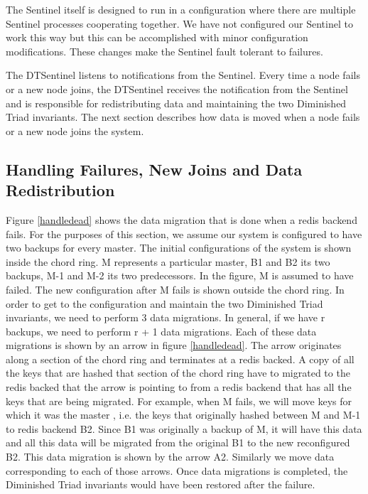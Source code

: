 \documentclass[10pt,twocolumn,letterpaper]{article}
\begin{document}
The Sentinel itself is designed to run in a configuration where there are multiple Sentinel processes cooperating together. We have not configured our Sentinel to work this way but this can be accomplished with minor configuration modifications. These changes make the Sentinel fault tolerant to failures. 

The DTSentinel listens to notifications from the Sentinel. Every time a node fails or a new node joins, the DTSentinel receives the notification from the Sentinel and is responsible for redistributing data and maintaining the two Diminished Triad invariants. The next section describes how data is moved when a node fails or a new node joins the system.

\subsection{Handling Failures, New Joins and Data Redistribution}

Figure \ref{handledead} shows the data migration that is done when a redis backend fails. For the purposes of this section, we assume our system is configured to have two backups for every master. The initial configurations of the system is shown inside the chord ring. M represents a particular master, B1 and B2 its two backups, M-1 and M-2 its two predecessors. In the figure, M is assumed to have failed. The new configuration after M fails is shown outside the chord ring. In order to get to the configuration and maintain the two Diminished Triad invariants, we need to perform 3 data migrations. In general, if we have r backups, we need to perform r + 1 data migrations. Each of these data migrations is shown by an arrow in figure \ref{handledead}. The arrow originates along a section of the chord ring and terminates at a redis backed. A copy of all the keys that are hashed that section of the chord ring have to migrated to the redis backed that the arrow is pointing to from a redis backend that has all the keys that are being migrated. For example, when M fails, we will move keys for which it was the master , i.e. the keys that originally hashed between M and M-1 to redis backend B2. Since B1 was originally a backup of M, it will have this data and all this data will be migrated from the original B1 to the new reconfigured B2. This data migration is shown by the arrow A2. Similarly we move data corresponding to each of those arrows. Once data migrations is completed, the Diminished Triad invariants would have been restored after the failure. 
\end{document}
